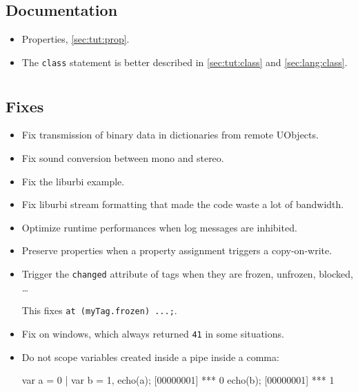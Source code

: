 \subsection{Documentation}
\begin{itemize}
\item Properties, \autoref{sec:tut:prop}.
\item The \lstinline|class| statement is better described in
  \autoref{sec:tut:class} and \autoref{sec:lang:class}.
\end{itemize}


\section{}

\subsection{Fixes}

\begin{itemize}
\item Fix transmission of binary data in dictionaries from remote UObjects.
\item Fix sound conversion between mono and stereo.
\item Fix the  liburbi example.
\item Fix liburbi stream formatting that made the code waste a lot of
  bandwidth.
\item Optimize runtime performances when log messages are inhibited.
\item Preserve properties when a property assignment triggers a copy-on-write.
\item Trigger the \lstinline|changed| attribute of tags when they are
  frozen, unfrozen, blocked, \ldots

  This fixes \lstinline|at (myTag.frozen) ...;|.
\item Fix  on windows, which always returned
  \lstinline|41| in some situations.
\item Do not scope variables created inside a pipe inside a comma:
  \begin{urbiscript}
var a = 0 | var b = 1,
echo(a);
[00000001] *** 0
echo(b);
[00000001] *** 1
  \end{urbiscript}
\end{itemize}

